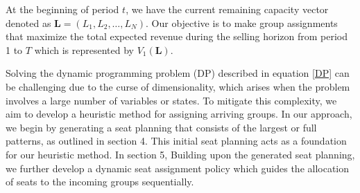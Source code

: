 At the beginning of period $t$, we have the current remaining capacity vector denoted as $\mathbf{L} = (L_1, L_2, \ldots, L_N)$. Our objective is to make group assignments that maximize the total expected revenue during the selling horizon from period 1 to $T$ which is represented by $V_1(\mathbf{L})$.

Solving the dynamic programming problem (DP) described in equation \eqref{DP} can be challenging due to the curse of dimensionality, which arises when the problem involves a large number of variables or states. To mitigate this complexity, we aim to develop a heuristic method for assigning arriving groups. In our approach, we begin by generating a seat planning that consists of the largest or full patterns, as outlined in section 4. This initial seat planning acts as a foundation for our heuristic method. In section 5, Building upon the generated seat planning, we further develop a dynamic seat assignment policy which guides the allocation of seats to the incoming groups sequentially. 










